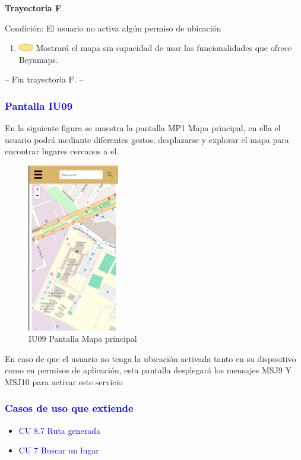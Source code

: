\textbf{Trayectoria F}

Condición: El usuario no activa algún permiso de ubicación
\begin{enumerate}
    \item \includegraphics[width=0.0500\textwidth]{Figuras/sistema.png} Mostrará el mapa sin capacidad de usar las funcionalidades que ofrece Beyamaps.
    \end{enumerate}
-- Fin trayectoria F. --\\


\subsubsection{\textcolor{blue}{Pantalla IU09}}
En la siguiente figura se muestra la pantalla MP1 Mapa principal, en ella el usuario podrá mediante diferentes gestos, desplazarse y explorar el mapa para encontrar lugares cercanos a el. 

    \begin{figure}[htb]
        \centering
        \includegraphics[width= 4cm]{entregable final/pantallasSistema/IU09 Pantalla Mapa principal.png}
    \caption{IU09 Pantalla Mapa principal}
        \label{fig:enter-label}
    \end{figure}

En caso de que el usuario no tenga la ubicación activada tanto en su dispositivo como en permisos de aplicación, esta pantalla desplegará los mensajes MSJ9 Y MSJ10 para activar este servicio

\subsubsection{\textcolor{blue}{Casos de uso que extiende}}
\begin{itemize}
    \item {\textcolor{blue}{CU 8.7 Ruta generada}}
    \item {\textcolor{blue}{CU 7 Buscar un lugar}}
\end{itemize}

